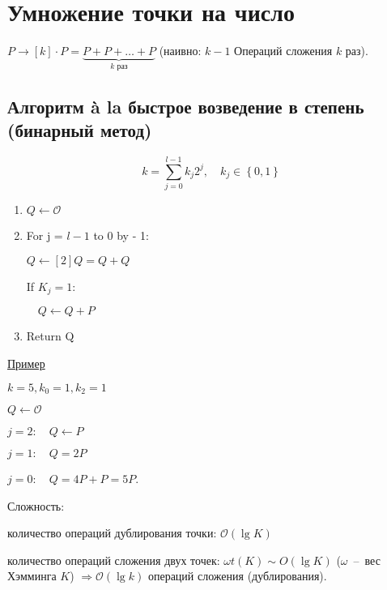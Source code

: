 \documentclass[12pt]{article}
\newcommand{\bigO}{\mathcal{O}}
\theoremstyle{definition}
\theoremstyle{definition}
\theoremstyle{definition}
\begin{document}
\section{Умножение точки на число}
    $P \to \left[ k \right] \cdot P = \underbrace {P + P +  \ldots  + P}_{k{\text{ раз}}}$ (наивно: $k-1$ Операций сложения $k$ раз).
    
    \subsection{Алгоритм à la быстрое возведение в степень (бинарный метод)}
    $$k = \sum\limits_{j = 0}^{l - 1} {{k_j}{2^j}} ,\quad {k_j} \in \left\{ {0,1} \right\}
    $$
    
    \begin{enumerate}
    	\item $Q \leftarrow \mathcal{O}$
    	
    	\item For j = $l - 1$ to 0 by - 1:
    	
    	$Q \leftarrow \left[ 2 \right]Q = Q + Q$
    	
    	If ${K_j} = 1:$
    	
    	$\quad Q \leftarrow Q + P$
    	
    	\item Return Q
    \end{enumerate}
    
    \underline{Пример}
    
    $k = 5, k_0 = 1, k_2 = 1$
    
    $Q \leftarrow \mathcal{O}$
    
    $j = 2: \quad Q \leftarrow P$
    
    $j = 1: \quad Q = 2P$
    
    $j = 0: \quad Q = 4P + P = 5P$.
    
    Сложность: 
    
    количество операций дублирования точки: $\bigO(\lg K)$
      
    количество операций сложения двух точек: $\omega t(K)\sim O (\lg K)$ ($\omega$~--~вес Хэмминга $K$) $ \Rightarrow \bigO \left( {\lg k} \right)$ операций сложения (дублирования).
\end{document}
